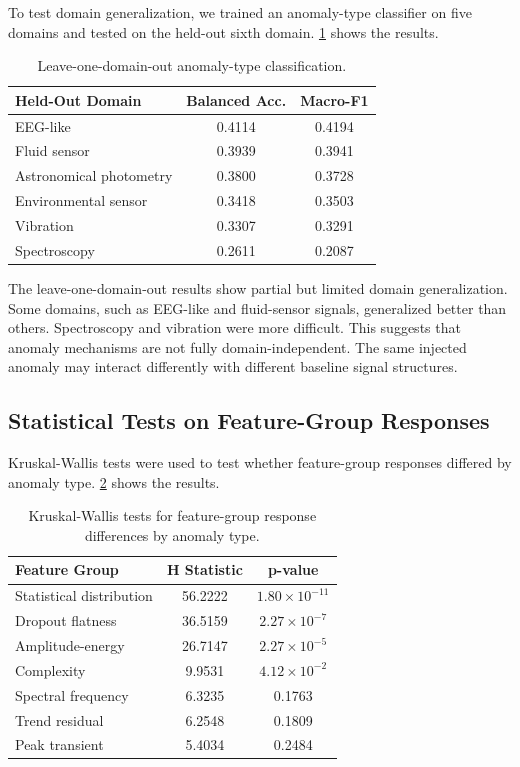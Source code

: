 To test domain generalization, we trained an anomaly-type classifier on five domains and tested on the held-out sixth domain. \cref{tab:logo} shows the results.

\begin{table}[htbp]
\centering
\caption{Leave-one-domain-out anomaly-type classification.}
\label{tab:logo}
\begin{tabular}{lcc}
\toprule
\textbf{Held-Out Domain} & \textbf{Balanced Acc.} & \textbf{Macro-F1} \\
\midrule
EEG-like & 0.4114 & 0.4194 \\
Fluid sensor & 0.3939 & 0.3941 \\
Astronomical photometry & 0.3800 & 0.3728 \\
Environmental sensor & 0.3418 & 0.3503 \\
Vibration & 0.3307 & 0.3291 \\
Spectroscopy & 0.2611 & 0.2087 \\
\bottomrule
\end{tabular}
\end{table}

The leave-one-domain-out results show partial but limited domain generalization. Some domains, such as EEG-like and fluid-sensor signals, generalized better than others. Spectroscopy and vibration were more difficult. This suggests that anomaly mechanisms are not fully domain-independent. The same injected anomaly may interact differently with different baseline signal structures.

\subsection{Statistical Tests on Feature-Group Responses}

Kruskal-Wallis tests were used to test whether feature-group responses differed by anomaly type. \cref{tab:kruskal} shows the results.

\begin{table}[htbp]
\centering
\caption{Kruskal-Wallis tests for feature-group response differences by anomaly type.}
\label{tab:kruskal}
\begin{tabular}{lcc}
\toprule
\textbf{Feature Group} & \textbf{H Statistic} & \textbf{p-value} \\
\midrule
Statistical distribution & 56.2222 & \(1.80 \times 10^{-11}\) \\
Dropout flatness & 36.5159 & \(2.27 \times 10^{-7}\) \\
Amplitude-energy & 26.7147 & \(2.27 \times 10^{-5}\) \\
Complexity & 9.9531 & \(4.12 \times 10^{-2}\) \\
Spectral frequency & 6.3235 & 0.1763 \\
Trend residual & 6.2548 & 0.1809 \\
Peak transient & 5.4034 & 0.2484 \\
\bottomrule
\end{tabular}
\end{table}


